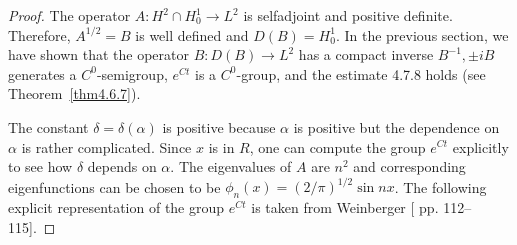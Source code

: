 \documentclass{surv-l}
\theoremstyle{plain}
\theoremstyle{definition}
\numberwithin{equation}{section}
\numberwithin{figure}{chapter}
\begin{document}
\begin{proof}
The operator $A\!:H^{2}\cap H_{0}^{1}\rightarrow L^{2}$ is selfadjoint and positive definite. Therefore, $A^{1/2}=B$ is well defined and $D(B)=H_{0}^{1}$. In the previous section, we have shown that the operator $B\!:D(B)\rightarrow L^{2}$ has a compact inverse $B^{-1}, \pm iB$ generates a $C^{0}$-semigroup, $e^{Ct}$ is a $C^{0}$-group, and the estimate 4.7.8 holds (see Theorem~\ref{thm4.6.7}).

The constant $\delta=\delta(\alpha)$ is positive because $\alpha$ is positive but the dependence on $\alpha$ is rather complicated. Since $x$ is in $R$, one can compute the group $e^{Ct}$ explicitly to see how $\delta$ depends on $\alpha$. The eigenvalues of $A$ are $n^{2}$ and corresponding eigenfunctions can be chosen to be $\phi_{n}(x)=(2/\pi)^{1/2}\sin nx$. The following explicit representation of the group $e^{Ct}$ is taken from Weinberger [\citeyear{1965w} pp. 112--115].


\end{proof}
\end{document}
